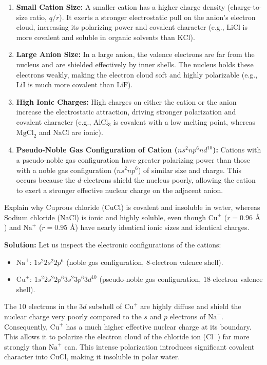 \documentclass[12pt,a4paper]{article}
\begin{document}
\begin{enumerate}
  \item \textbf{Small Cation Size:} A smaller cation has a higher charge density (charge-to-size ratio, $q/r$). It exerts a stronger electrostatic pull on the anion's electron cloud, increasing its polarizing power and covalent character (e.g., $\text{LiCl}$ is more covalent and soluble in organic solvents than $\text{KCl}$).
  \item \textbf{Large Anion Size:} In a large anion, the valence electrons are far from the nucleus and are shielded effectively by inner shells. The nucleus holds these electrons weakly, making the electron cloud soft and highly polarizable (e.g., $\text{LiI}$ is much more covalent than $\text{LiF}$).
  \item \textbf{High Ionic Charges:} High charges on either the cation or the anion increase the electrostatic attraction, driving stronger polarization and covalent character (e.g., $\text{AlCl}_3$ is covalent with a low melting point, whereas $\text{MgCl}_2$ and $\text{NaCl}$ are ionic).
  \item \textbf{Pseudo-Noble Gas Configuration of Cation ($ns^2 np^6 nd^{10}$):} Cations with a pseudo-noble gas configuration have greater polarizing power than those with a noble gas configuration ($ns^2 np^6$) of similar size and charge. This occurs because the $d$-electrons shield the nucleus poorly, allowing the cation to exert a stronger effective nuclear charge on the adjacent anion.
\end{enumerate}

\begin{tcolorbox}[examplebox, title={Example 5.3: Fajans' Rules Application}]
  Explain why Cuprous chloride ($\text{CuCl}$) is covalent and insoluble in water, whereas Sodium chloride ($\text{NaCl}$) is ionic and highly soluble, even though $\text{Cu}^+$ ($r = 0.96\text{ \AA}$) and $\text{Na}^+$ ($r = 0.95\text{ \AA}$) have nearly identical ionic sizes and identical charges.
  \par\vspace{4pt}
  \textbf{Solution:}
  Let us inspect the electronic configurations of the cations:
  \begin{itemize}[leftmargin=1cm, itemsep=2pt]
    \item $\text{Na}^+$: $1s^2 2s^2 2p^6$ (noble gas configuration, $8$-electron valence shell).
    \item $\text{Cu}^+$: $1s^2 2s^2 2p^6 3s^2 3p^6 3d^{10}$ (pseudo-noble gas configuration, $18$-electron valence shell).
  \end{itemize}
  The 10 electrons in the $3d$ subshell of $\text{Cu}^+$ are highly diffuse and shield the nuclear charge very poorly compared to the $s$ and $p$ electrons of $\text{Na}^+$. Consequently, $\text{Cu}^+$ has a much higher effective nuclear charge at its boundary. This allows it to polarize the electron cloud of the chloride ion ($\text{Cl}^-$) far more strongly than $\text{Na}^+$ can. This intense polarization introduces significant covalent character into $\text{CuCl}$, making it insoluble in polar water.
\end{tcolorbox}
\end{document}
